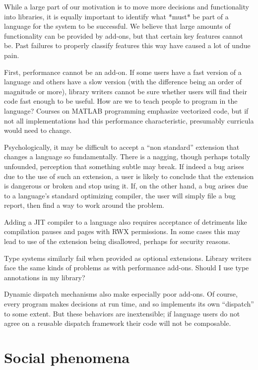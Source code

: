 {While a large part of our motivation is to move more decisions and functionality
into libraries, it is equally important to identify what *must* be part of a
language for the system to be successful. We believe that large amounts of
functionality can be provided by add-ons, but that certain key features
cannot be. Past failures to properly classify features this way have
caused a lot of undue pain.

First, performance cannot be an add-on. If some users have a fast version of
a language and others have a slow version (with the difference being an
order of magnitude or more), library writers cannot be sure whether users
will find their code fast enough to be useful. How are we to teach people to
program in the language? Courses on MATLAB programming emphasize vectorized code,
but if not all implementations had this performance characteristic,
presumably curricula would need to change.

Psychologically, it may be difficult to accept a ``non standard'' extension
that changes a language so fundamentally. There is a nagging, though perhaps
totally unfounded, perception that something subtle may break. If indeed a
bug arises due to the use of such an extension, a user is likely to conclude
that the extension is dangerous or broken and stop using it. If, on the other
hand, a bug arises due to a language's standard optimizing compiler, the user
will simply file a bug report, then find a way to work around the problem.

Adding a JIT compiler to a language also requires acceptance of detriments
like compilation pauses and pages with RWX permissions. In some cases this
may lead to use of the extension being disallowed, perhaps for security
reasons.

Type systems similarly fail when provided as optional extensions. Library
writers face the same kinds of problems as with performance add-ons. Should I
use type annotations in my library?

Dynamic dispatch mechanisms also make especially poor add-ons. Of course,
every program makes decisions at run time, and so implements its own
``dispatch'' to some extent. But these behaviors are inextensible; if
language users do not agree on a reusable dispatch framework their code
will not be composable.


\section{Social phenomena}

}
